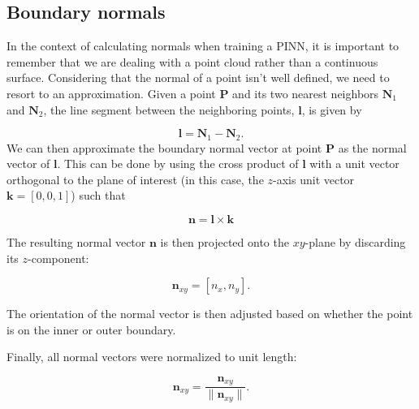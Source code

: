



\subsection{Boundary normals}
In the context of calculating normals when training a PINN, it is important to remember that we are dealing with a point cloud rather than a continuous surface. 
Considering that the normal of a point isn't well defined, we need to resort to an approximation. 
Given a point \( \mathbf{P} \) and its two nearest neighbors \( \mathbf{N}_1 \) and \( \mathbf{N}_2 \), the line segment between the neighboring points, \( \mathbf{l} \), is given by

\[
\mathbf{l} = \mathbf{N}_1 - \mathbf{N}_2.
\]
We can then approximate the boundary normal vector at point \( \mathbf{P} \) as the normal vector of \( \mathbf{l} \).
This can be done by using the cross product of \( \mathbf{l} \) with a unit vector orthogonal to the plane of interest (in this case, the \( z \)-axis unit vector \( \mathbf{k} = [0, 0, 1] \)) such that

\[
\mathbf{n} = \mathbf{l} \times \mathbf{k}
\]

The resulting normal vector \( \mathbf{n} \) is then projected onto the \( xy \)-plane by discarding its \( z \)-component:

\[
\mathbf{n}_{xy} = [n_x, n_y].
\]

The orientation of the normal vector is then adjusted based on whether the point is on the inner or outer boundary. 


Finally, all normal vectors were normalized to unit length:

\[
\mathbf{n}_{xy} = \frac{\mathbf{n}_{xy}}{\|\mathbf{n}_{xy}\|}.
\]



